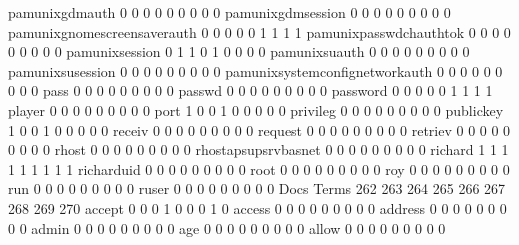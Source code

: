 \documentclass[compress,8pt]{beamer}
\begin{document}
\begin{frame}
\begin{Schunk}
  pamunixgdmauth                             0   0   0   0   0   0   0   0   0
  pamunixgdmsession                          0   0   0   0   0   0   0   0   0
  pamunixgnomescreensaverauth                0   0   0   0   0   1   1   1   1
  pamunixpasswdchauthtok                     0   0   0   0   0   0   0   0   0
  pamunixsession                             0   1   1   0   1   0   0   0   0
  pamunixsuauth                              0   0   0   0   0   0   0   0   0
  pamunixsusession                           0   0   0   0   0   0   0   0   0
  pamunixsystemconfignetworkauth             0   0   0   0   0   0   0   0   0
  pass                                       0   0   0   0   0   0   0   0   0
  passwd                                     0   0   0   0   0   0   0   0   0
  password                                   0   0   0   0   0   1   1   1   1
  player                                     0   0   0   0   0   0   0   0   0
  port                                       1   0   0   1   0   0   0   0   0
  privileg                                   0   0   0   0   0   0   0   0   0
  publickey                                  1   0   0   1   0   0   0   0   0
  receiv                                     0   0   0   0   0   0   0   0   0
  request                                    0   0   0   0   0   0   0   0   0
  retriev                                    0   0   0   0   0   0   0   0   0
  rhost                                      0   0   0   0   0   0   0   0   0
  rhostapsupsrvbasnet                        0   0   0   0   0   0   0   0   0
  richard                                    1   1   1   1   1   1   1   1   1
  richarduid                                 0   0   0   0   0   0   0   0   0
  root                                       0   0   0   0   0   0   0   0   0
  roy                                        0   0   0   0   0   0   0   0   0
  run                                        0   0   0   0   0   0   0   0   0
  ruser                                      0   0   0   0   0   0   0   0   0
                                          Docs
Terms                                      262 263 264 265 266 267 268 269 270
  accept                                     0   0   0   1   0   0   0   1   0
  access                                     0   0   0   0   0   0   0   0   0
  address                                    0   0   0   0   0   0   0   0   0
  admin                                      0   0   0   0   0   0   0   0   0
  age                                        0   0   0   0   0   0   0   0   0
  allow                                      0   0   0   0   0   0   0   0   0

\end{Schunk}
\end{frame}
\end{document}
